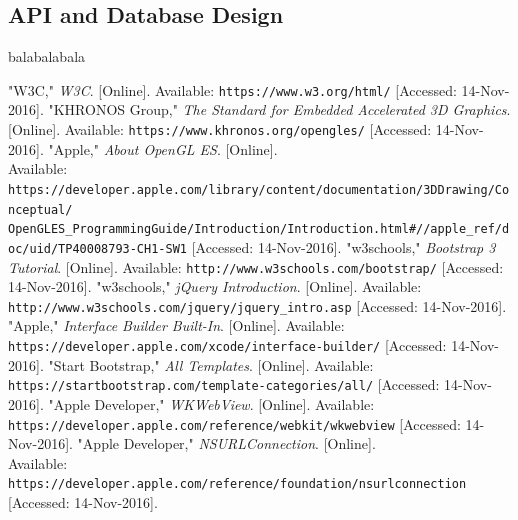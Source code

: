 \documentclass[letterpaper, 10pt,titlepage]{article}
\begin{document}
\subsection{API and Database Design}
balabalabala





\newpage %
\begin{thebibliography}{9}

"W3C," \textit{W3C}. [Online]. Available:
\texttt{https://www.w3.org/html/} [Accessed: 14-Nov-2016].
"KHRONOS Group," \textit{The Standard for Embedded Accelerated 3D Graphics}. [Online]. Available:
\texttt{https://www.khronos.org/opengles/} [Accessed: 14-Nov-2016].
"Apple," \textit{About OpenGL ES}. [Online]. \\
Available:
\texttt{https://developer.apple.com/library/content/documentation/3DDrawing/Conceptual/\\OpenGLES\_ProgrammingGuide/Introduction/Introduction.html\#//apple\_ref/doc/uid/TP40008793-CH1-SW1} [Accessed: 14-Nov-2016].
"w3schools," \textit{Bootstrap 3 Tutorial}. [Online]. Available:
\texttt{http://www.w3schools.com/bootstrap/} [Accessed: 14-Nov-2016].
"w3schools," \textit{jQuery Introduction}. [Online]. Available:
\texttt{http://www.w3schools.com/jquery/jquery\_intro.asp} [Accessed: 14-Nov-2016].
"Apple," \textit{Interface Builder Built-In}. [Online]. Available:
\texttt{https://developer.apple.com/xcode/interface-builder/} [Accessed: 14-Nov-2016].
"Start Bootstrap," \textit{All Templates}. [Online]. Available:
\texttt{https://startbootstrap.com/template-categories/all/} [Accessed: 14-Nov-2016].
"Apple Developer," \textit{WKWebView}. [Online]. Available:
\texttt{https://developer.apple.com/reference/webkit/wkwebview} [Accessed: 14-Nov-2016].
"Apple Developer," \textit{NSURLConnection}. [Online]. 
\\Available: \texttt{https://developer.apple.com/reference/foundation/nsurlconnection} [Accessed: 14-Nov-2016].




















\end{thebibliography}
\end{document}
